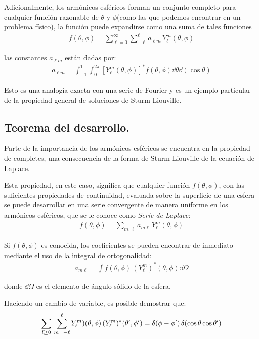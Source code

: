 Adicionalmente, los armónicos esféricos forman un conjunto completo para cualquier función razonable de $\theta$ y $\phi$(como las que podemos encontrar en un problema físico), la función puede expandirse como una suma de tales funciones
\begin{align}
f(\theta, \phi) = \sum_{\ell=0}^{\infty} \sum_{-\ell}^{\ell} a_{\ell m} \, Y_{\ell}^{m} (\theta, \phi)
\label{eq:ecuacion_18_47}
\end{align}

las constantes $a_{\ell m}$ están dadas por:
\begin{align}
a_{\ell m} = \int_{-1}^{1} \int_{0}^{2 \pi} [ Y_{\ell}^{m} (\theta, \phi) ]^{*} f (\theta, \phi) \dd{\theta} \dd{(\cos \theta)}
\label{eq:ecuacion_048}
\end{align}

Esto es una analogía exacta con una serie de Fourier y es un ejemplo particular de la propiedad general de soluciones de Sturm-Liouville.

\subsection{Teorema del desarrollo.}

Parte de la importancia de los armónicos esféricos se encuentra en la propiedad de completes, una consecuencia de la forma de Sturm-Liouville de la ecuación de Laplace.
\par
Esta propiedad, en este caso, significa que cualquier función $f(\theta, \phi)$, con las suficientes propiedades de continuidad, evaluada sobre la superficie de una esfera se puede desarrollar en una serie convergente de manera uniforme en los armónicos esféricos, que se le conoce como \emph{Serie de Laplace}:
\begin{align}
f(\theta, \phi) = \sum_{m, \ell} a_{m \ell} \, Y_{\ell}^{m} (\theta, \phi)
\label{eq:ecuacion_12_151}
\end{align}

Si $f(\theta, \phi)$ es conocida, los coeficientes se pueden encontrar de inmediato mediante el uso de la integral de ortogonalidad:
\begin{align}
a_{m \ell} = \int f(\theta, \phi) \, (Y_{\ell}^{m})^{*} (\theta, \phi) \dd{\Omega}
\label{eq:ecuacion_10_237}
\end{align}

donde $\dd{\Omega}$ es el elemento de ángulo sólido de la esfera.
\par
Haciendo un cambio de variable, es posible demostrar que:
\begin{align}
\sum_{l \geq 0} \, \sum_{m=-\ell}^{\ell} Y_{\ell}^{m}) (\theta, \phi) \, (Y_{\ell}^{m})^{*} ({\theta}^{\prime}, {\phi}^{\prime}) = \delta(\phi - {\phi}^{\prime}) \, \delta(\cos \theta  \cos {\theta}^{\prime})
\label{eq:ecuacion_10_238}
\end{align}

